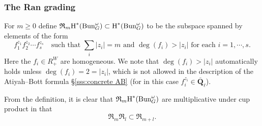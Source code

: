 \documentclass[reqno]{amsart}
\numberwithin{equation}{subsection}
\theoremstyle{definition}
\newcommand\frR{\mathfrak{R}}
\newcommand{\Bun}{\textup{Bun}}
\newcommand{\Qlbar}{\overline{\Q}_\ell}
\newcommand{\bu}{\bullet}
\newcommand{\cohog}[2]{\textup{H}^{#1}({#2})}     %
\newcommand{\om}{\omega}
\newcommand{\Q}{\mathbf{Q}}
\begin{document}
    
\subsubsection{The Ran grading}\label{sss:Ran gr}

For $m\ge0$ define $\frR_m\cohog{*}{\Bun^{\om}_{G}}\subset \cohog{*}{\Bun_G^\om}$ to be the subspace spanned by elements of the form
\begin{equation*}
f_{1}^{z_{1}}f_{2}^{z_{2}}\cdots f_{s}^{z_{s}} \quad \mbox{such that $\sum_{i}|z_{i}|=m$ and $\deg(f_{i})>|z_{i}|$ for each $i=1,\cdots, s$.}
\end{equation*}
Here the $f_{i}\in R^{W}_{+}$ are homogeneous. We note that $\deg(f_{i})>|z_{i}|$ automatically holds unless $\deg(f_{i})=2=|z_{i}|$, which is not allowed in the description of the Atiyah--Bott formula \S\ref{sss:concrete AB} (for in this case $f_{i}^{z_{i}}\in \Qlbar$). 

From the definition, it is clear that $\frR_m\cohog{*}{\Bun^{\om}_{G}}$ are multiplicative under cup product in that
\begin{equation*}
    \frR_m\frR_l\subset \frR_{m+l}.
\end{equation*}
\end{document}
